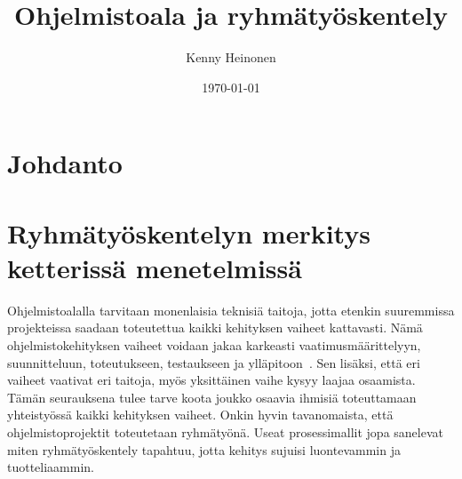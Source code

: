 \documentclass[finnish]{../tktltiki2}
\title{Ohjelmistoala ja ryhmätyöskentely}
\author{Kenny Heinonen}
\date{\today}
\theoremstyle{definition}
\theoremstyle{remark}
\begin{document}

\maketitle        %

\tableofcontents  %
\newpage          %



\section{Johdanto}

\section{Ryhmätyöskentelyn merkitys ketterissä menetelmissä}


Ohjelmistoalalla tarvitaan monenlaisia teknisiä taitoja, jotta etenkin 
suuremmissa projekteissa saadaan toteutettua kaikki kehityksen vaiheet 
kattavasti. Nämä ohjelmistokehityksen vaiheet voidaan jakaa karkeasti 
vaatimusmäärittelyyn, suunnitteluun, toteutukseen, testaukseen ja 
ylläpitoon~\cite{Capretz:2010:MSS:1726559.1726574}. Sen lisäksi, että 
eri vaiheet vaativat eri taitoja, myös yksittäinen vaihe kysyy laajaa 
osaamista. Tämän seurauksena tulee tarve koota joukko osaavia ihmisiä 
toteuttamaan yhteistyössä kaikki kehityksen vaiheet. Onkin hyvin 
tavanomaista, että ohjelmistoprojektit toteutetaan ryhmätyönä. Useat 
prosessimallit jopa sanelevat miten ryhmätyöskentely tapahtuu, jotta 
kehitys sujuisi luontevammin ja tuotteliaammin.\\
\end{document}
